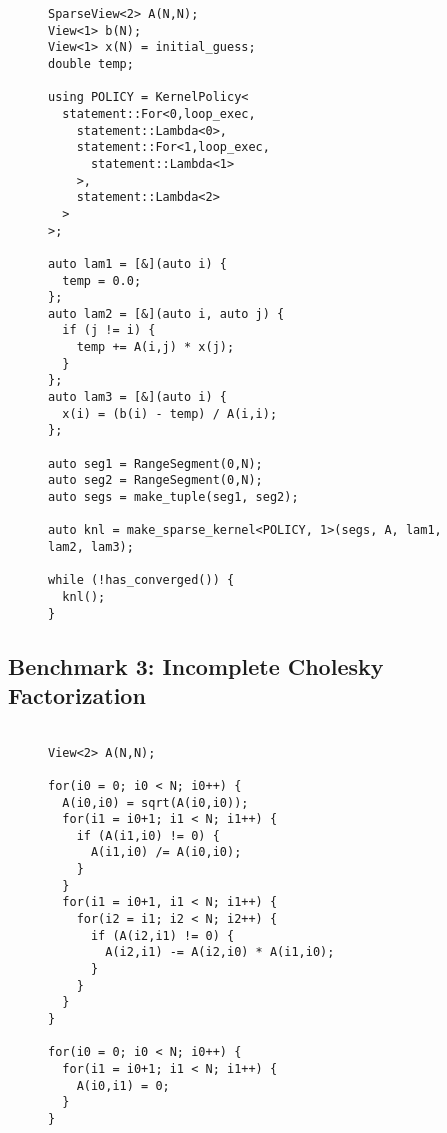 \begin{figure}
\begin{lstlisting}[caption={\sparseraja{} version of Gauss-Seidel iteration},label=SparseRAJAGauSei]
SparseView<2> A(N,N);
View<1> b(N);
View<1> x(N) = initial_guess;
double temp;

using POLICY = KernelPolicy<
  statement::For<0,loop_exec,
    statement::Lambda<0>,
    statement::For<1,loop_exec,
      statement::Lambda<1>
    >,
    statement::Lambda<2>
  >
>;

auto lam1 = [&](auto i) {
  temp = 0.0;
};
auto lam2 = [&](auto i, auto j) {
  if (j != i) {
    temp += A(i,j) * x(j);
  }
};
auto lam3 = [&](auto i) {
  x(i) = (b(i) - temp) / A(i,i);
};

auto seg1 = RangeSegment(0,N);
auto seg2 = RangeSegment(0,N);
auto segs = make_tuple(seg1, seg2);

auto knl = make_sparse_kernel<POLICY, 1>(segs, A, lam1, lam2, lam3);

while (!has_converged()) {
  knl();
}
\end{lstlisting}
\end{figure}

\subsection{Benchmark 3: Incomplete Cholesky Factorization}
\begin{figure}
\begin{lstlisting}[caption={C++ reference implementation of incomplete Cholesky factorization.},label=CppInCholFact]

View<2> A(N,N);   

for(i0 = 0; i0 < N; i0++) {
  A(i0,i0) = sqrt(A(i0,i0));
  for(i1 = i0+1; i1 < N; i1++) {
    if (A(i1,i0) != 0) {
      A(i1,i0) /= A(i0,i0);
    }
  }
  for(i1 = i0+1, i1 < N; i1++) {
    for(i2 = i1; i2 < N; i2++) {
      if (A(i2,i1) != 0) {
        A(i2,i1) -= A(i2,i0) * A(i1,i0);
      }
    }
  }
}

for(i0 = 0; i0 < N; i0++) {
  for(i1 = i0+1; i1 < N; i1++) {
    A(i0,i1) = 0;
  }
}
\end{lstlisting}
\end{figure}






